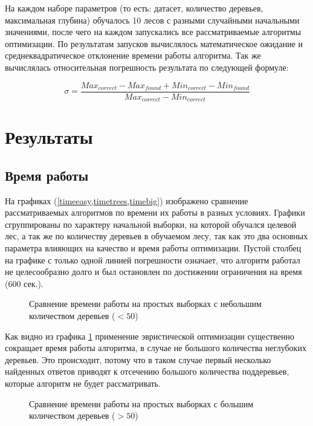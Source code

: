 На каждом наборе параметров (то есть: датасет, количество деревьев, максимальная
глубина) обучалось 10 лесов с разными случайными начальными значениями, после
чего на каждом запускались все рассматриваемые алгоритмы оптимизации. По
результатам запусков вычислялось математическое ожидание и среднеквадратическое
отклонение времени работы алгоритма. Так же вычислялась относительная
погрешность результата по следующей формуле:

\[
    \sigma = \frac{Max_{correct} - Max_{found} + Min_{correct} - Min_{found}}
    {Max_{correct} - Min_{correct}}
\]

\section{Результаты}

\subsection{Время работы}

На графиках (\cref{timeeasy,timetrees,timebig}) изображено сравнение
рассматриваемых алгоритмов по времени их работы в разных условиях. Графики
сгруппированы по характеру начальной выборки, на которой обучался целевой лес,
а так же по количеству деревьев в обучаемом лесу, так как это два основных
параметра влияющих на качество и время работы оптимизации. Пустой столбец на
графике с только одной линией погрешности означает, что алгоритм работал не
целесообразно долго и был остановлен по достижении ограничения на время (600
сек.).

\begin{figure}[!ht]
    \caption{Сравнение времени работы на простых выборках с небольшим
    количеством деревьев ($<50$)}\label{timeeasy}
\end{figure}

Как видно из графика \cref{timeeasy} применение эвристической оптимизации
существенно сокращает время работы алгоритма, в случае не большого количества
неглубоких деревьев. Это происходит, потому что в таком случае первый несколько
найденных ответов приводят к отсечению большого количества поддеревьев, которые
алгоритм не будет рассматривать.

\begin{figure}[!ht]
    \caption{Сравнение времени работы на простых выборках с большим количеством
    деревьев ($>50$)}\label{timetrees}
\end{figure}

